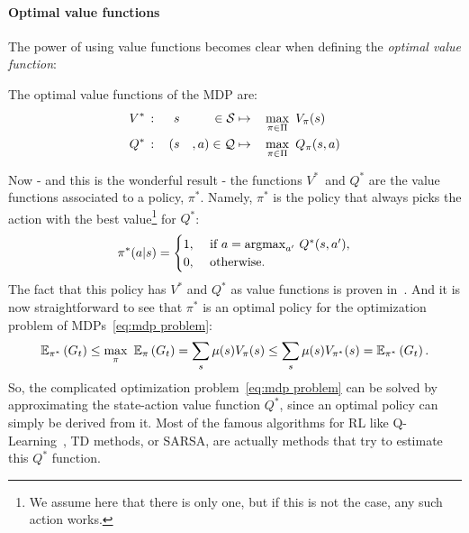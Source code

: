 			\paragraph{Optimal value functions} The power of using value functions becomes clear when defining the\emph{ optimal value function}:
			\begin{definition}
				The optimal value functions of the MDP are:
				\begin{alignat}{6}
					V^*\,&:&\,&s&\in\mathcal{S}&\mapsto& & \max_{\pi\in\Pi}~V_\pi(s) \label{eq:optimal state value}\\
					Q^*\,&:&\,(&s&, a)\in\mathcal{Q}&\mapsto& & \max_{\pi\in\Pi}~Q_\pi(s, a) \label{eq:optimal state action value}
				\end{alignat}
			\end{definition}
			Now - and this is the wonderful result - the functions $V^*$~and $Q^*$ are the value functions associated to a policy, $\pi^*$. Namely, $\pi^*$ is the policy that always picks the action with the best value\footnote{We assume here that there is only one, but if this is not the case, any such action works.} for $Q^*$:
			\begin{equation}
				\pi^*(a|s) = \begin{cases}
				1,&\text{ if } a = \operatorname*{argmax}_{a'}\,Q^*(s, a'),\\
				0,&\text{ otherwise}.
				\end{cases} \label{eq:optimal policy}
			\end{equation} The fact that this policy has $V^*$ and $Q^*$ as value functions is proven in~\cite[Chapter\,4]{sutton2018reinforcement}. And it is now straightforward to see that $\pi^*$ is an optimal policy for the optimization problem of MDPs~\eqref{eq:mdp problem}:
			\begin{equation*}
				\mathbb{E}_{\pi^*}\left(G_t\right) \leq \max_\pi~\mathbb{E}_\pi\left(G_t\right) = \sum_s \mu(s) V_\pi(s) \leq \sum_s \mu(s) V_{\pi^*}(s) = \mathbb{E}_{\pi^*}\left(G_t\right).
			\end{equation*}
			So, the complicated optimization problem~\eqref{eq:mdp problem} can be solved by approximating the state-action value function $Q^*$, since an optimal policy can simply be derived from it. Most of the famous algorithms for RL like Q-Learning~\cite{watkins1992q}, TD methods\needcite, or SARSA\needcite, are actually methods that try to estimate this $Q^*$ function.
			
